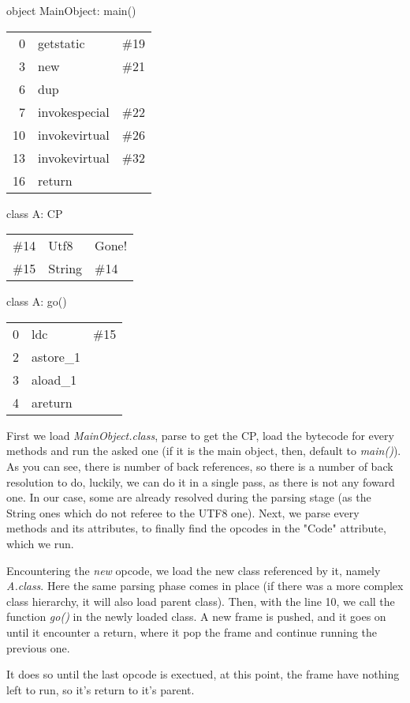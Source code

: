 object MainObject: main()
\newline
\begin{tabular}{r l l} \hline
	0	& getstatic	& \#19	\\
	3	& new		& \#21	\\
	6	& dup		&	\\
	7	& invokespecial	& \#22	\\
	10	& invokevirtual	& \#26	\\
	13	& invokevirtual	& \#32	\\
	16	& return	&	\\
\end{tabular}
\newline

class A: CP
\newline
\begin{tabular}{r l l} \hline
	\#14	& Utf8		& Gone!	\\
	\#15	& String	& \#14	\\
\end{tabular}
\newline

class A: go()
\newline
\begin{tabular}{r l l} \hline
	0	& ldc		& \#15	\\
	2	& astore\_1	&	\\
	3	& aload\_1	&	\\
	4	& areturn	&	\\
\end{tabular}
\newline

First we load \emph{MainObject.class}, parse to get the CP, load the bytecode
for every methods and run the asked one (if it is the main object, then, default
to \emph{main()}). As you can see, there is number of back references, so there
is a number of back resolution to do, luckily, we can do it in a single pass, as
there is not any foward one. In our case, some are already resolved during
the parsing stage (as the String ones which do not referee to the UTF8 one).
Next, we parse every methods and its attributes, to finally find the opcodes in
the "Code" attribute, which we run.

Encountering the \emph{new} opcode, we load the new class referenced by it,
namely \emph{A.class}. Here the same parsing phase comes in place (if there was
a more complex class hierarchy, it will also load parent class). Then, with the
line 10, we call the function \emph{go()} in the newly loaded class. A new frame
is pushed, and it goes on until it encounter a return, where it pop the frame
and continue running the previous one.

It does so until the last opcode is exectued, at this point, the frame have
nothing left to run, so it's return to it's parent.

